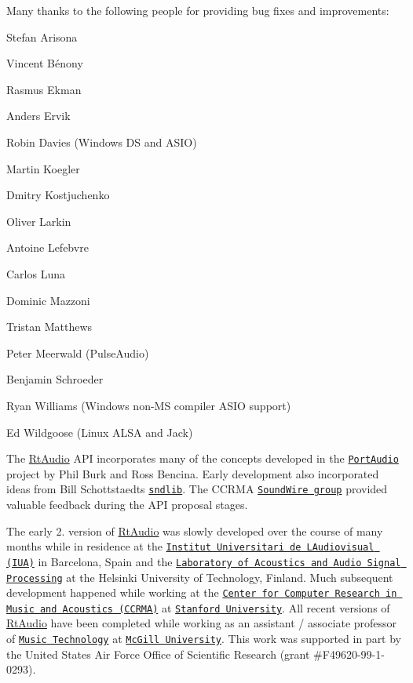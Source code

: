 Many thanks to the following people for providing bug fixes and improvements\+: 
\begin{DoxyItemize}
\item Stefan Arisona 
\item Vincent B\'{e}nony 
\item Rasmus Ekman 
\item Anders Ervik 
\item Robin Davies (Windows DS and A\+S\+IO) 
\item Martin Koegler 
\item Dmitry Kostjuchenko 
\item Oliver Larkin 
\item Antoine Lefebvre 
\item Carlos Luna 
\item Dominic Mazzoni 
\item Tristan Matthews 
\item Peter Meerwald (Pulse\+Audio) 
\item Benjamin Schroeder 
\item Ryan Williams (Windows non-\/\+MS compiler A\+S\+IO support) 
\item Ed Wildgoose (Linux A\+L\+SA and Jack)


\end{DoxyItemize}

The \hyperlink{class_rt_audio}{Rt\+Audio} A\+PI incorporates many of the concepts developed in the \href{http://www.portaudio.com/}{\tt Port\+Audio} project by Phil Burk and Ross Bencina. Early development also incorporated ideas from Bill Schottstaedt\textquotesingle{}s \href{http://www-ccrma.stanford.edu/software/snd/sndlib/}{\tt sndlib}. The C\+C\+R\+MA \href{http://www-ccrma.stanford.edu/groups/soundwire/}{\tt Sound\+Wire group} provided valuable feedback during the A\+PI proposal stages.

The early 2. version of \hyperlink{class_rt_audio}{Rt\+Audio} was slowly developed over the course of many months while in residence at the \href{http://www.iua.upf.es/}{\tt Institut Universitari de L\textquotesingle{}Audiovisual (I\+UA)} in Barcelona, Spain and the \href{http://www.acoustics.hut.fi/}{\tt Laboratory of Acoustics and Audio Signal Processing} at the Helsinki University of Technology, Finland. Much subsequent development happened while working at the \href{http://www-ccrma.stanford.edu/}{\tt Center for Computer Research in Music and Acoustics (C\+C\+R\+MA)} at \href{http://www.stanford.edu/}{\tt Stanford University}. All recent versions of \hyperlink{class_rt_audio}{Rt\+Audio} have been completed while working as an assistant / associate professor of \href{http://www.music.mcgill.ca/musictech/}{\tt Music Technology} at \href{http://www.mcgill.ca/}{\tt Mc\+Gill University}. This work was supported in part by the United States Air Force Office of Scientific Research (grant \#F49620-\/99-\/1-\/0293). 
